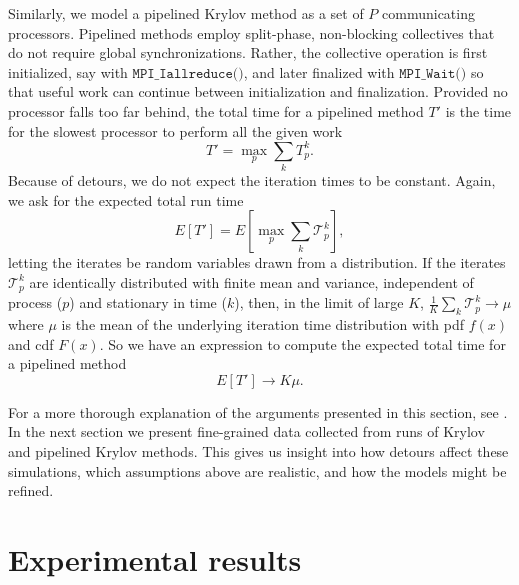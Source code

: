 \documentclass[sigconf]{acmart}
\begin{document}
Similarly, we model a pipelined Krylov method as a set of $P$ communicating processors. Pipelined methods employ split-phase, non-blocking collectives that do not require global synchronizations. Rather, the collective operation is first initialized, say with  ${\texttt{MPI\_Iallreduce()}}$, and later finalized with ${\texttt{MPI\_Wait()}}$ so that useful work can continue between initialization and finalization. 
Provided no processor falls too far behind, the total time for a pipelined method $T'$ is the time for the slowest processor to perform all the given work 
\begin{equation}
T' = \max_p \sum_k T^k_p.
\end{equation}
Because of detours, we do not expect the iteration times to be constant. Again, we ask for the expected total run time
\begin{equation}
E[T'] = E\left[\max_p \sum_k \mathcal{T}^k_p\right], \label{eq:pipeline-expression}
\end{equation}
letting the iterates be random variables drawn from a distribution. 
If the iterates $\mathcal{T}^k_p$ are identically distributed with finite mean and variance, independent of process ($p$) and stationary in time ($k$), then, in the limit of large $K$, $\tfrac{1}{K}\sum_k\mathcal{T}^k_p \rightarrow \mu$ where $\mu$ is the mean of the underlying iteration time distribution with pdf $f(x)$ and cdf $F(x)$. So we have an expression to compute the expected total time for a pipelined method
\begin{equation}
E[T'] \rightarrow K\mu. \label{eq:pipeline-model}
\end{equation}

For a more thorough explanation of the arguments presented in this section, see \cite{morgan2016krylov}.
In the next section we present fine-grained data collected from runs of Krylov and pipelined Krylov methods. This gives us insight into how detours affect these simulations, which assumptions above are realistic, and how the models might be refined. 

\section{Experimental results} \label{sec:experimental-results}
\end{document}
